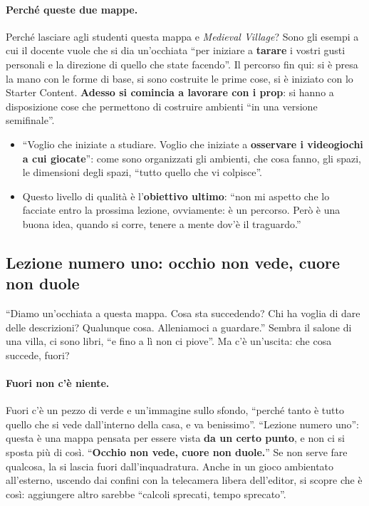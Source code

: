 \paragraph{Perché queste due mappe.} Perché lasciare agli studenti questa mappa e
\emph{Medieval Village}? Sono gli esempi a cui il docente vuole che si dia
un'occhiata ``per iniziare a \textbf{tarare} i vostri gusti personali e la direzione
di quello che state facendo''. Il percorso fin qui: si è presa la mano con le forme
di base, si sono costruite le prime cose, si è iniziato con lo Starter Content.
\textbf{Adesso si comincia a lavorare con i prop}: si hanno a disposizione cose che
permettono di costruire ambienti ``in una versione semifinale''.
\begin{itemize}
  \item ``Voglio che iniziate a studiare. Voglio che iniziate a
        \textbf{osservare i videogiochi a cui giocate}'': come sono organizzati
        gli ambienti, che cosa fanno, gli spazi, le dimensioni degli spazi,
        ``tutto quello che vi colpisce''.
  \item Questo livello di qualità è l'\textbf{obiettivo ultimo}: ``non mi aspetto
        che lo facciate entro la prossima lezione, ovviamente: è un percorso. Però è
        una buona idea, quando si corre, tenere a mente dov'è il traguardo.''
\end{itemize}

\subsection{Lezione numero uno: occhio non vede, cuore non duole}

``Diamo un'occhiata a questa mappa. Cosa sta succedendo? Chi ha voglia di dare delle
descrizioni? Qualunque cosa. Alleniamoci a guardare.'' Sembra il salone di una
villa, ci sono libri, ``e fino a lì non ci piove''. Ma c'è un'uscita: che cosa
succede, fuori?

\paragraph{Fuori non c'è niente.} Fuori c'è un pezzo di verde e un'immagine sullo
sfondo, ``perché tanto è tutto quello che si vede dall'interno della casa, e va
benissimo''. ``Lezione numero uno'': questa è una mappa pensata per essere vista
\textbf{da un certo punto}, e non ci si sposta più di così. ``\textbf{Occhio non vede,
cuore non duole.}'' Se non serve fare qualcosa, la si lascia fuori dall'inquadratura.
Anche in un gioco ambientato all'esterno, uscendo dai confini con la telecamera
libera dell'editor, si scopre che è così: aggiungere altro sarebbe ``calcoli
sprecati, tempo sprecato''.

